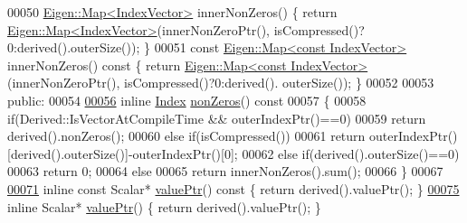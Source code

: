 \begin{DoxyCode}
00050     \hyperlink{group___core___module_class_eigen_1_1_map}{Eigen::Map<IndexVector>} innerNonZeros() \{ \textcolor{keywordflow}{return} 
      \hyperlink{group___core___module_class_eigen_1_1_map}{Eigen::Map<IndexVector>}(innerNonZeroPtr(), isCompressed()?0:derived().outerSize()); 
      \}
00051     \textcolor{keyword}{const}  \hyperlink{group___core___module_class_eigen_1_1_map}{Eigen::Map<const IndexVector>} innerNonZeros()\textcolor{keyword}{ const }\{ \textcolor{keywordflow}{return} 
      \hyperlink{group___core___module_class_eigen_1_1_map}{Eigen::Map<const IndexVector>}(innerNonZeroPtr(), isCompressed()?0:derived().
      outerSize()); \}
00052         
00053   \textcolor{keyword}{public}:
00054     
\hyperlink{group___sparse_core___module_a03de8b3da2c142ce8698a76123b3e7d3}{00056}     \textcolor{keyword}{inline} \hyperlink{group___core___module_a554f30542cc2316add4b1ea0a492ff02}{Index} \hyperlink{group___sparse_core___module_a03de8b3da2c142ce8698a76123b3e7d3}{nonZeros}()\textcolor{keyword}{ const}
00057 \textcolor{keyword}{    }\{
00058       \textcolor{keywordflow}{if}(Derived::IsVectorAtCompileTime && outerIndexPtr()==0)
00059         \textcolor{keywordflow}{return} derived().nonZeros();
00060       \textcolor{keywordflow}{else} \textcolor{keywordflow}{if}(isCompressed())
00061         \textcolor{keywordflow}{return} outerIndexPtr()[derived().outerSize()]-outerIndexPtr()[0];
00062       \textcolor{keywordflow}{else} \textcolor{keywordflow}{if}(derived().outerSize()==0)
00063         \textcolor{keywordflow}{return} 0;
00064       \textcolor{keywordflow}{else}
00065         \textcolor{keywordflow}{return} innerNonZeros().sum();
00066     \}
00067     
\hyperlink{group___sparse_core___module_a0f44c739398794ea77f310b745cc5627}{00071}     \textcolor{keyword}{inline} \textcolor{keyword}{const} Scalar* \hyperlink{group___sparse_core___module_a0f44c739398794ea77f310b745cc5627}{valuePtr}()\textcolor{keyword}{ const }\{ \textcolor{keywordflow}{return} derived().valuePtr(); \}
\hyperlink{group___sparse_core___module_a0f12f72d14b6c277d09be9f5ce2eab95}{00075}     \textcolor{keyword}{inline} Scalar* \hyperlink{group___sparse_core___module_a0f12f72d14b6c277d09be9f5ce2eab95}{valuePtr}() \{ \textcolor{keywordflow}{return} derived().valuePtr(); \}

\end{DoxyCode}
